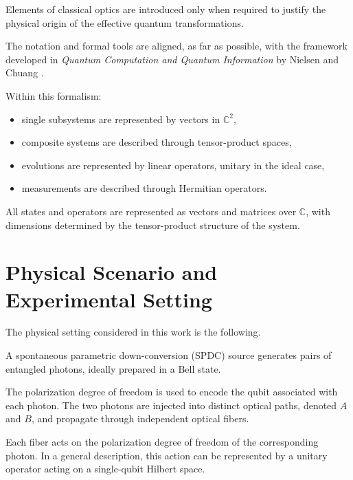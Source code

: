 Elements of classical optics are introduced only when required to justify the physical origin of the effective quantum transformations.

\medskip

The notation and formal tools are aligned, as far as possible, with the framework developed in \textit{Quantum Computation and Quantum Information} by Nielsen and Chuang \cite{nielsen_chuang_qcqi}.

\medskip

Within this formalism:

\begin{itemize}
    \item single subsystems are represented by vectors in \( \mathbb{C}^{2} \),
    \item composite systems are described through tensor-product spaces,
    \item evolutions are represented by linear operators, unitary in the ideal case,
    \item measurements are described through Hermitian operators.
\end{itemize}

\medskip

All states and operators are represented as vectors and matrices over \( \mathbb{C} \), with dimensions determined by the tensor-product structure of the system.


\section{Physical Scenario and Experimental Setting}

The physical setting considered in this work is the following.

A spontaneous parametric down-conversion (SPDC) source generates pairs of entangled photons, ideally prepared in a Bell state.

The polarization degree of freedom is used to encode the qubit associated with each photon. The two photons are injected into distinct optical paths, denoted \( A \) and \( B \), and propagate through independent optical fibers.

\medskip

Each fiber acts on the polarization degree of freedom of the corresponding photon. In a general description, this action can be represented by a unitary operator acting on a single-qubit Hilbert space.

